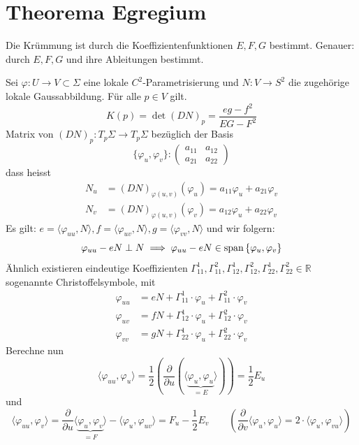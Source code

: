 \documentclass[../main.tex]{subfiles}
\begin{document}
\section{Theorema Egregium}
\begin{goal}
    Die Krümmung ist durch die Koeffizientenfunktionen $E,F,G$ bestimmt. Genauer: durch $E,F,G$ und ihre Ableitungen bestimmt.
\end{goal}
Sei $\varphi:U\to V \subset \Sigma$ eine lokale $C^{2}$-Parametrisierung und $N:V\to S^{2}$ die zugehörige lokale Gaussabbildung.
Für alle $p\in V$ gilt. $$K(p) = \det(DN)_{p} = \frac{eg-f^{2}}{EG-F^{2}}$$
Matrix von $(DN)_{p}:T_{p}\Sigma\to T_{p}\Sigma$ bezüglich der Basis $$\{\varphi_{u},\varphi_{v}\}: \begin{pmatrix}
    a_{11} & a_{12}\\ a_{21} & a_{22} \end{pmatrix}$$ dass heisst \begin{align*}
        N_{u} &= (DN)_{\varphi(u,v)}(\varphi_{u}) = a_{11} \varphi_{u} + a_{21}\varphi_{v}\\
        N_{v} &= (DN)_{\varphi(u,v)}(\varphi_{v}) = a_{12} \varphi_{u} + a_{22}\varphi_{v}
    \end{align*}
Es gilt: $e = \langle\varphi_{uu}, N\rangle, f = \langle\varphi_{uv}, N\rangle, g = \langle\varphi_{vv}, N\rangle$ und wir folgern: $$\varphi_{uu}-eN\perp N\\ \implies \varphi_{uu}-eN \in \operatorname{span}{\{\varphi_{u},\varphi_{v}\}}$$
Ähnlich existieren eindeutige Koeffizienten $\Gamma_{11}^{1},\Gamma_{11}^{2},\Gamma_{12}^{1},\Gamma_{12}^{2},\Gamma_{22}^{1},\Gamma_{22}^{2}\in\mathbb{R}$ sogenannte Christoffelsymbole, mit \begin{align*}
    \varphi_{uu} &= eN + \Gamma_{11}^{1}\cdot\varphi_{u} + \Gamma_{11}^{2}\cdot\varphi_{v}\\
    \varphi_{uv} &= fN + \Gamma_{12}^{1}\cdot\varphi_{u} + \Gamma_{12}^{2}\cdot\varphi_{v}\\
    \varphi_{vv} &= gN + \Gamma_{22}^{1}\cdot\varphi_{u} + \Gamma_{22}^{2}\cdot\varphi_{v}
\end{align*} Berechne nun $$\langle\varphi_{uu},\varphi_{u}\rangle = \frac{1}{2}\left(\frac{\partial}{\partial u}(\langle\underbrace{\varphi_{u},\varphi_{u}}_{=E}\rangle)\right) = \frac{1}{2}E_{u}$$ und 
$$\langle\varphi_{uu},\varphi_{v}\rangle = \frac{\partial}{\partial u}\langle\underbrace{\varphi_{u},\varphi_{v}}_{=F}\rangle - \langle\varphi_{u},\varphi_{uv}\rangle = F_{u} - \frac{1}{2}E_{v} \qquad \left(\frac{\partial}{\partial v}\langle\varphi_{u},\varphi_{u}\rangle = 2\cdot\langle\varphi_{u},\varphi_{vu}\rangle\right)$$
\end{document}
